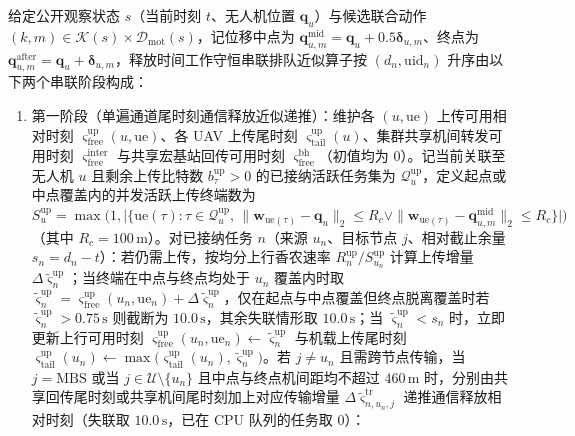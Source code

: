 \begin{definition}
给定公开观察状态 $s$（当前时刻 $t$、无人机位置 $\mathbf q_u$）与候选联合动作 $(k,m)\in\mathcal{K}(s)\times\mathcal{D}_{\mathrm{mot}}(s)$，记位移中点为 $\mathbf q_{u,m}^{\mathrm{mid}}=\mathbf q_u+0.5\boldsymbol\delta_{u,m}$、终点为 $\mathbf q_{u,m}^{\mathrm{after}}=\mathbf q_u+\boldsymbol\delta_{u,m}$，释放时间工作守恒串联排队近似算子按 $(d_n,\mathrm{uid}_n)$ 升序由以下两个串联阶段构成：

\begin{enumerate}
\item 第一阶段（单遍通道尾时刻通信释放近似递推）：维护各 $(u,\mathrm{ue})$ 上传可用相对时刻 $\varsigma^{\mathrm{up}}_{\mathrm{free}}(u,\mathrm{ue})$、各 UAV 上传尾时刻 $\varsigma^{\mathrm{up}}_{\mathrm{tail}}(u)$、集群共享机间转发可用时刻 $\varsigma^{\mathrm{inter}}_{\mathrm{free}}$ 与共享宏基站回传可用时刻 $\varsigma^{\mathrm{bh}}_{\mathrm{free}}$（初值均为 $0$）。记当前关联至无人机 $u$ 且剩余上传比特数 $b_\tau^{\mathrm{up}}>0$ 的已接纳活跃任务集为 $\mathcal{Q}_u^{\mathrm{up}}$，定义起点或中点覆盖内的并发活跃上传终端数为 $S_u^{\mathrm{up}}=\max\big(1,\big|\{\mathrm{ue}(\tau):\tau\in\mathcal{Q}_u^{\mathrm{up}},\,\|\mathbf{w}_{\mathrm{ue}(\tau)}-\mathbf{q}_u\|_2\leq R_c\lor\|\mathbf{w}_{\mathrm{ue}(\tau)}-\mathbf{q}_{u,m}^{\mathrm{mid}}\|_2\leq R_c\}\big|\big)$（其中 $R_c=100\,\mathrm{m}$）。对已接纳任务 $n$（来源 $u_n$、目标节点 $j$、相对截止余量 $s_n=d_n-t$）：若仍需上传，按均分上行香农速率 $R^{\mathrm{up}}_{n}/S_{u_n}^{\mathrm{up}}$ 计算上传增量 $\Delta\tilde\varsigma_n^{\mathrm{up}}$；当终端在中点与终点均处于 $u_n$ 覆盖内时取 $\tilde\varsigma_n^{\mathrm{up}}=\varsigma^{\mathrm{up}}_{\mathrm{free}}(u_n,\mathrm{ue}_n)+\Delta\tilde\varsigma_n^{\mathrm{up}}$，仅在起点与中点覆盖但终点脱离覆盖时若 $\tilde\varsigma_n^{\mathrm{up}}>0.75\,\mathrm{s}$ 则截断为 $10.0\,\mathrm{s}$，其余失联情形取 $10.0\,\mathrm{s}$；当 $\tilde\varsigma_n^{\mathrm{up}}<s_n$ 时，立即更新上行可用时刻 $\varsigma^{\mathrm{up}}_{\mathrm{free}}(u_n,\mathrm{ue}_n)\leftarrow\tilde\varsigma_n^{\mathrm{up}}$ 与机载上传尾时刻 $\varsigma^{\mathrm{up}}_{\mathrm{tail}}(u_n)\leftarrow\max\big(\varsigma^{\mathrm{up}}_{\mathrm{tail}}(u_n),\tilde\varsigma_n^{\mathrm{up}}\big)$。若 $j\neq u_n$ 且需跨节点传输，当 $j=\mathrm{MBS}$ 或当 $j\in\mathcal U\setminus\{u_n\}$ 且中点与终点机间距均不超过 $460\,\mathrm{m}$ 时，分别由共享回传尾时刻或共享机间尾时刻加上对应传输增量 $\Delta\tilde\varsigma_{n,u_n,j}^{\mathrm{tr}}$ 递推通信释放相对时刻（失联取 $10.0\,\mathrm{s}$，已在 CPU 队列的任务取 $0$）：

\end{enumerate}
\end{definition}
